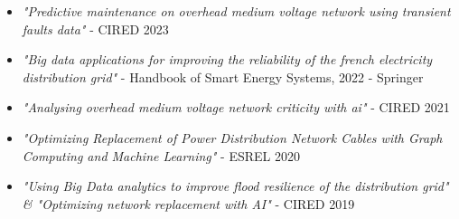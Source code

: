 \documentclass[letterpaper]{twentysecondcv} %
\begin{document}
\begin{itemize}

        \item \textit{"Predictive maintenance on overhead medium voltage network using transient faults data"} - CIRED 2023
        \item \textit{"Big data applications for improving the reliability of the french electricity distribution grid"} - Handbook of Smart Energy Systems, 2022 - Springer
        \item \textit{"Analysing overhead medium voltage network criticity with ai"} - CIRED 2021
        \item \textit{"Optimizing Replacement of Power Distribution Network Cables with Graph Computing and Machine Learning"} - ESREL 2020
        \item \textit{"Using Big Data analytics to improve flood resilience of the distribution grid" \& "Optimizing network replacement with AI"} - CIRED 2019
\end{itemize}

%
\end{document}

